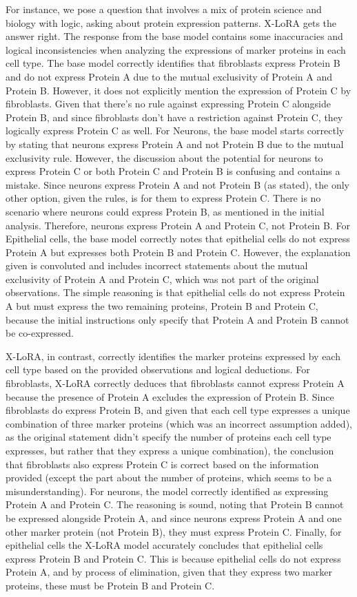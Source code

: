 For instance, we pose a question that involves a mix of protein science and biology with logic, asking about protein expression patterns. X-LoRA gets the answer right. The  response from the base model contains some inaccuracies and logical inconsistencies when analyzing the expressions of marker proteins in each cell type. The base model correctly identifies that fibroblasts express Protein B and do not express Protein A due to the mutual exclusivity of Protein A and Protein B. However, it does not explicitly mention the expression of Protein C by fibroblasts. Given that there's no rule against expressing Protein C alongside Protein B, and since fibroblasts don't have a restriction against Protein C, they logically express Protein C as well. For Neurons, the base model starts correctly by stating that neurons express Protein A and not Protein B due to the mutual exclusivity rule. However, the discussion about the potential for neurons to express Protein C or both Protein C and Protein B is confusing and contains a mistake. Since neurons express Protein A and not Protein B (as stated), the only other option, given the rules, is for them to express Protein C. There is no scenario where neurons could express Protein B, as mentioned in the initial analysis. Therefore, neurons express Protein A and Protein C, not Protein B. For Epithelial cells, the base model correctly notes that epithelial cells do not express Protein A but expresses both Protein B and Protein C. However, the explanation given is convoluted and includes incorrect statements about the mutual exclusivity of Protein A and Protein C, which was not part of the original observations. The simple reasoning is that epithelial cells do not express Protein A but must express the two remaining proteins, Protein B and Protein C, because the initial instructions only specify that Protein A and Protein B cannot be co-expressed. 

X-LoRA, in contrast, correctly identifies the marker proteins expressed by each cell type based on the provided observations and logical deductions. For fibroblasts, X-LoRA correctly deduces that fibroblasts cannot express Protein A because the presence of Protein A excludes the expression of Protein B. Since fibroblasts do express Protein B, and given that each cell type expresses a unique combination of three marker proteins (which was an incorrect assumption added), as the original statement didn't specify the number of proteins each cell type expresses, but rather that they express a unique combination), the conclusion that fibroblasts also express Protein C is correct based on the information provided (except the part about the number of proteins, which seems to be a misunderstanding). For neurons, the model correctly identified as expressing Protein A and Protein C. The reasoning is sound, noting that Protein B cannot be expressed alongside Protein A, and since neurons express Protein A and one other marker protein (not Protein B), they must express Protein C. Finally, for epithelial cells the X-LoRA model accurately concludes that epithelial cells express Protein B and Protein C. This is because epithelial cells do not express Protein A, and by process of elimination, given that they express two marker proteins, these must be Protein B and Protein C.

